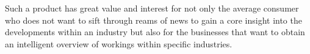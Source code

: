 Such a product has great value and interest for not only the average consumer who does not want to sift through reams of news to gain a core insight into the developments within an industry but also for the businesses that want to obtain an intelligent overview of workings within specific industries.





